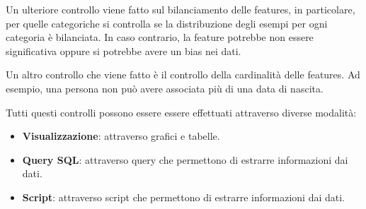 Un ulteriore controllo viene fatto sul bilanciamento delle features, in particolare,
per quelle categoriche si controlla se la distribuzione degli esempi per ogni
categoria è bilanciata. In caso contrario, la feature potrebbe non essere significativa
oppure si potrebbe avere un bias nei dati.

Un altro controllo che viene fatto è il controllo della cardinalità delle features.
Ad esempio, una persona non può avere associata più di una data di nascita.

Tutti questi controlli possono essere essere effettuati attraverso diverse modalità:
\begin{itemize}
      \item \textbf{Visualizzazione}: attraverso grafici e tabelle.
      \item \textbf{Query SQL}: attraverso query che permettono di estrarre
            informazioni dai dati.
      \item \textbf{Script}: attraverso script che permettono di estrarre
            informazioni dai dati.
\end{itemize}

